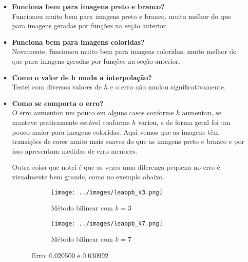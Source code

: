 \documentclass[leqno]{article}
\begin{document}
\begin{itemize}
    \item \textbf{Funciona bem para imagens preto e branco?} \\
        Funcionou muito bem para imagens preto e branco, muito melhor do que
        para imagens geradas por funções na seção anterior.

    \item \textbf{Funciona bem para imagens coloridas?} \\
        Novamente, funcionou muito bem para imagens coloridas, muito melhor do que
        para imagens geradas por funções na seção anterior.

    \item \textbf{Como o valor de h muda a interpolação?} \\
        Testei com diversos valores de $h$ e o erro não mudou significativamente.
    
    \item \textbf{Como se comporta o erro?} \\
        O erro aumentou um pouco em alguns casos conforme $k$ aumentou, se manteve praticamente
        estável conforme $h$ variou, e de forma geral foi um pouco maior para imagens
        coloridas. Aqui vemos que as imagens têm transições de cores muito mais suaves
        do que as imagens preto e branco e por isso apresentam medidas de erro
        menores. 

        Outra coisa que notei é que as vezes uma diferença pequena no erro é
        visualmente bem grande, como no exemplo abaixo. 
        
        \begin{figure}[H]
          \centering
          \begin{subfigure}{.45\textwidth}
            \centering
            \texttt{[image: ../images/leaopb\_k3.png]}
            \caption{Método bilinear com $k = 3$}
            \label{fig:sub2}
          \end{subfigure}
          \begin{subfigure}{.45\textwidth}
              \centering
              \texttt{[image: ../images/leaopb\_k7.png]}
              \caption{Método bilinear com $k = 7$}
              \label{fig:sub1}
            \end{subfigure}%
          \caption{Erro: 0.020500 e 0.030992}
          \label{fig:test}
      \end{figure}


\end{itemize}
\end{document}
